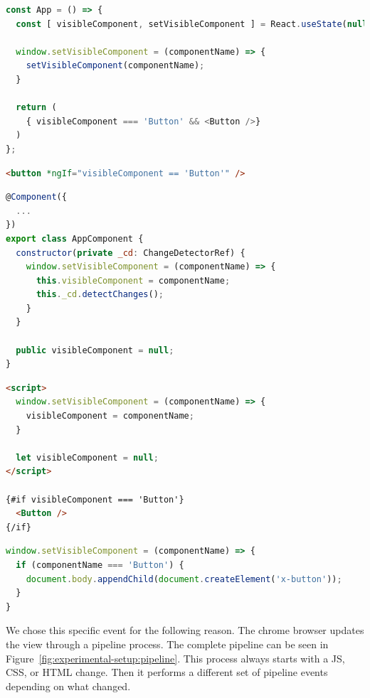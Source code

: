 \begin{lstlisting}[language={JavaScript},caption={The render-on-demand function in ReactJS},label={lst:experimental-setup:react-set-visible}]
const App = () => {
  const [ visibleComponent, setVisibleComponent ] = React.useState(null);

  window.setVisibleComponent = (componentName) => {
    setVisibleComponent(componentName);
  }

  return (
    { visibleComponent === 'Button' && <Button />}
  )
};
\end{lstlisting}

\begin{lstlisting}[language={HTML},caption={The render-on-demand function in Angular (HTML file)},label={lst:experimental-setup:angular-set-visible-html}]
<button *ngIf="visibleComponent == 'Button'" />
\end{lstlisting}

\begin{lstlisting}[language={JavaScript},caption={The render-on-demand function in Angular (JavaScript file)},label={lst:experimental-setup:angular-set-visible-js}]
@Component({
  ...
})
export class AppComponent {
  constructor(private _cd: ChangeDetectorRef) {
    window.setVisibleComponent = (componentName) => {
      this.visibleComponent = componentName;
      this._cd.detectChanges();
    }
  }

  public visibleComponent = null;
}
\end{lstlisting}

\begin{lstlisting}[language={HTML},caption={The render-on-demand function in Svelte},label={lst:experimental-setup:svelte-set-visible}]
<script>
  window.setVisibleComponent = (componentName) => {
    visibleComponent = componentName;
  }

  let visibleComponent = null;
</script>

{#if visibleComponent === 'Button'}
  <Button />
{/if}
\end{lstlisting}

\begin{lstlisting}[language={JavaScript}, caption={The render-on-demand function in Web Components},label={lst:experimental-setup:web-components-set-visible}]
window.setVisibleComponent = (componentName) => {
  if (componentName === 'Button') {
    document.body.appendChild(document.createElement('x-button'));
  }
}
\end{lstlisting}

We chose this specific event for the following reason. The chrome browser updates the view through a pipeline process. The complete pipeline can be seen in Figure~\ref{fig:experimental-setup:pipeline}. This process always starts with a JS, CSS, or HTML change. Then it performs a different set of pipeline events depending on what changed.


